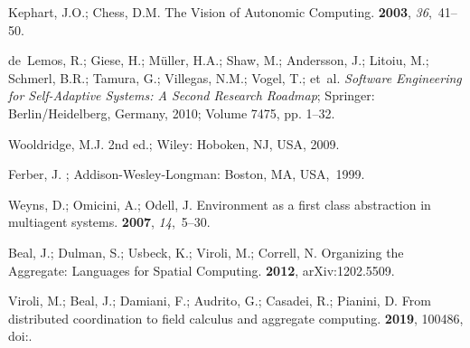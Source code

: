 \documentclass[jsan,article,accept,moreauthors,pdftex]{Definitions/mdpi}
\begin{document}
\begin{thebibliography}{999}

Kephart, J.O.; Chess, D.M.
\newblock The Vision of Autonomic Computing.
 {\bf 2003}, {\em 36},~41--50.

de~Lemos, R.; Giese, H.; M{\"{u}}ller, H.A.; Shaw, M.; Andersson, J.; Litoiu,
  M.; Schmerl, B.R.; Tamura, G.; Villegas, N.M.; Vogel, T.; \mbox{et al}.
\newblock \emph{Software Engineering for Self-Adaptive Systems: {A} Second Research
  Roadmap};
\newblock   Springer:  Berlin/Heidelberg, Germany, %
  2010;
  Volume 7475, pp. 1--32.

Wooldridge, M.J.
  2nd ed.; Wiley:  Hoboken, NJ, USA, %
 2009.

Ferber, J.
; Addison-Wesley-Longman: Boston, MA, USA,~1999.

Weyns, D.; Omicini, A.; Odell, J.
\newblock Environment as a first class abstraction in multiagent systems.
 {\bf 2007}, {\em 14},~5--30.

Beal, J.; Dulman, S.; Usbeck, K.; Viroli, M.; Correll, N.
\newblock Organizing the Aggregate: Languages for Spatial Computing.
 {\bf 2012}, arXiv:1202.5509.

Viroli, M.; Beal, J.; Damiani, F.; Audrito, G.; Casadei, R.; Pianini, D.
\newblock From distributed coordination to field calculus and aggregate
  computing.
 {\bf 2019}, 100486,
\newblock
  doi:{\href{https://doi.org/Https://Doi.Org/10.1016/J.Jlamp.2019.100486}{}}.


\end{thebibliography}
\end{document}

